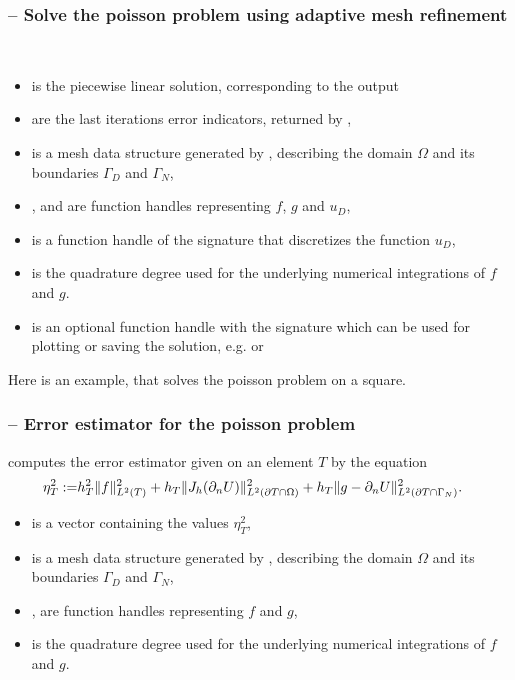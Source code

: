\documentclass[twoside,11pt,a4paper]{article} %
\begin{document}
\subsubsection*{\texorpdfstring{ --}{} Solve the poisson problem using adaptive mesh refinement}
 \\
\begin{itemize}
 \item {} is the piecewise linear solution, corresponding to the output 
 \item {} are the last iterations error indicators, returned by ,
 \item {} is a mesh data structure generated by , describing the domain $\Omega$ and its boundaries $\Gamma_D$ and $\Gamma_N$,
 \item {},  and  are function handles representing $f$, $g$ and $u_D$,
 \item {} is a function handle of the signature  that discretizes the function $u_D$,
 \item {} is the quadrature degree used for the underlying numerical integrations of $f$ and $g$.
 \item {} is an optional function handle with the signature  which can be used for plotting or saving the solution, e.g.  or 
\end{itemize}
Here is an example, that solves the poisson problem on a square.

\subsubsection*{\texorpdfstring{ --}{} Error estimator for the poisson problem}
 computes the error estimator given on an element $T$ by the equation
\begin{align*}
 \eta_T^2:=& h_T^2 \lVert f\rVert_{L^2(T)}^2 + h_T \lVert J_h(\partial_n U)\rVert_{L^2(\partial T \cap \Omega)}^2 + h_T \lVert g - \partial_n U\rVert_{L^2(\partial T \cap \Gamma_N)}^2.
\end{align*}
\begin{itemize}
 \item {} is a vector containing the values $\eta_T^2$,
 \item {} is a mesh data structure generated by , describing the domain $\Omega$ and its boundaries $\Gamma_D$ and $\Gamma_N$,
 \item {},  are function handles representing $f$ and $g$,
 \item {} is the quadrature degree used for the underlying numerical integrations of $f$ and $g$.
\end{itemize}
\end{document}
